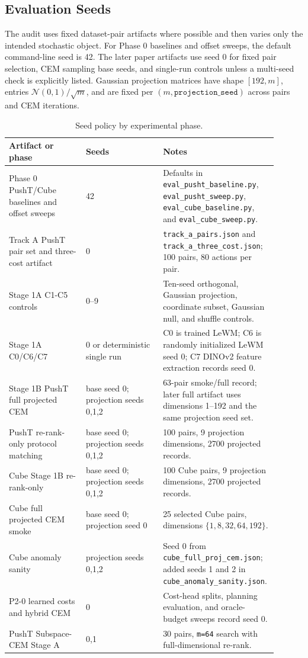 \subsection{Evaluation Seeds}

The audit uses fixed dataset-pair artifacts where possible and then varies only
the intended stochastic object. For Phase 0 baselines and offset sweeps, the
default command-line seed is 42. The later paper artifacts use seed 0 for fixed
pair selection, CEM sampling base seeds, and single-run controls unless a
multi-seed check is explicitly listed. Gaussian projection matrices have shape
\([192,m]\), entries \(\mathcal{N}(0,1)/\sqrt{m}\), and are fixed per
\((m,\texttt{projection\_seed})\) across pairs and CEM iterations.

\begin{table}[h]
\centering
\small
\begin{tabular}{p{0.28\linewidth}p{0.28\linewidth}p{0.34\linewidth}}
\toprule
Artifact or phase & Seeds & Notes \\
\midrule
Phase 0 PushT/Cube baselines and offset sweeps & 42 & Defaults in \texttt{eval\_pusht\_baseline.py}, \texttt{eval\_pusht\_sweep.py}, \texttt{eval\_cube\_baseline.py}, and \texttt{eval\_cube\_sweep.py}. \\
Track A PushT pair set and three-cost artifact & 0 & \texttt{track\_a\_pairs.json} and \texttt{track\_a\_three\_cost.json}; 100 pairs, 80 actions per pair. \\
Stage 1A C1-C5 controls & 0--9 & Ten-seed orthogonal, Gaussian projection, coordinate subset, Gaussian null, and shuffle controls. \\
Stage 1A C0/C6/C7 & 0 or deterministic single run & C0 is trained LeWM; C6 is randomly initialized LeWM seed 0; C7 DINOv2 feature extraction records seed 0. \\
Stage 1B PushT full projected CEM & base seed 0; projection seeds 0,1,2 & 63-pair smoke/full record; later full artifact uses dimensions 1--192 and the same projection seed set. \\
PushT re-rank-only protocol matching & base seed 0; projection seeds 0,1,2 & 100 pairs, 9 projection dimensions, 2700 projected records. \\
Cube Stage 1B re-rank-only & base seed 0; projection seeds 0,1,2 & 100 Cube pairs, 9 projection dimensions, 2700 projected records. \\
Cube full projected CEM smoke & base seed 0; projection seed 0 & 25 selected Cube pairs, dimensions \(\{1,8,32,64,192\}\). \\
Cube anomaly sanity & projection seeds 0,1,2 & Seed 0 from \texttt{cube\_full\_proj\_cem.json}; added seeds 1 and 2 in \texttt{cube\_anomaly\_sanity.json}. \\
P2-0 learned costs and hybrid CEM & 0 & Cost-head splits, planning evaluation, and oracle-budget sweeps record seed 0. \\
PushT Subspace-CEM Stage A & 0,1 & 30 pairs, \texttt{m=64} search with full-dimensional re-rank. \\
\bottomrule
\end{tabular}
\caption{Seed policy by experimental phase.}
\label{tab:appendix-seeds}
\end{table}

